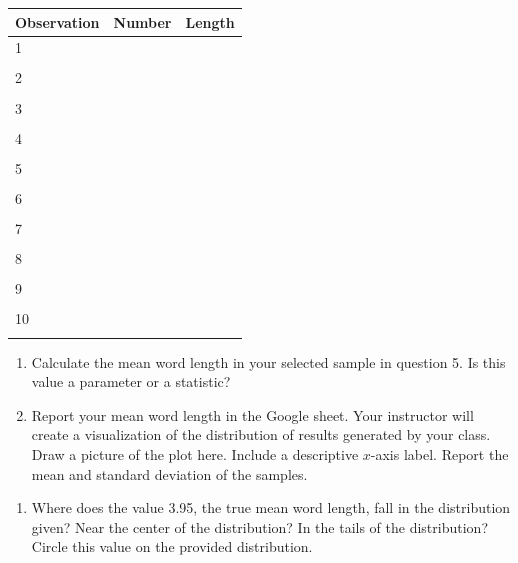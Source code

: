 \documentclass[
]{report}
\providecommand{\tightlist}{%
  \setlength{\itemsep}{0pt}\setlength{\parskip}{0pt}}
\begin{document}
\begin{center}
\begin{tabular}{|l|l|p{1in}|} \hline
Observation & Number & Length  \\ \hline
1 & & \\ 
& & \\ \hline
2 & & \\ 
& & \\ \hline
3 & & \\ 
& & \\ \hline
4 & & \\ 
& & \\ \hline
5 & & \\ 
& & \\ \hline
6 & & \\ 
& & \\ \hline
7 & & \\
& & \\ \hline
8 & & \\ 
& & \\ \hline
9 & &\\ 
& & \\ \hline
10 & & \\ 
& & \\ \hline
\end{tabular}
\end{center}

\begin{enumerate}
\def\labelenumi{\arabic{enumi}.}
\setcounter{enumi}{5}
\item
  Calculate the mean word length in your selected sample in question 5. Is this value a parameter or a statistic?
  \vspace{0.3in}
\item
  Report your mean word length in the Google sheet. Your instructor will create a visualization of the distribution of results generated by your class. Draw a picture of the plot here. Include a descriptive \(x\)-axis label. Report the mean and standard deviation of the samples.
\end{enumerate}

\vspace{2.25in}

\begin{enumerate}
\def\labelenumi{\arabic{enumi}.}
\setcounter{enumi}{7}
\tightlist
\item
  Where does the value 3.95, the true mean word length, fall in the distribution given? Near the center of the distribution? In the tails of the distribution? Circle this value on the provided distribution.
  \vspace{0.3in}
\end{enumerate}
\end{document}
